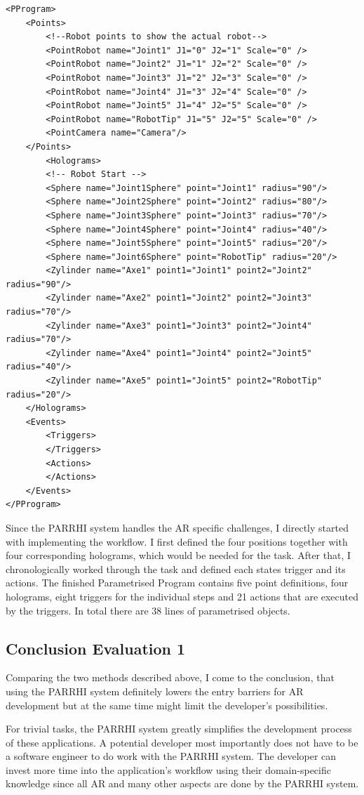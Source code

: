 \begin{lstlisting}
<PProgram>
	<Points>
		<!--Robot points to show the actual robot-->
		<PointRobot name="Joint1" J1="0" J2="1" Scale="0" />
		<PointRobot name="Joint2" J1="1" J2="2" Scale="0" />
		<PointRobot name="Joint3" J1="2" J2="3" Scale="0" />
		<PointRobot name="Joint4" J1="3" J2="4" Scale="0" />
		<PointRobot name="Joint5" J1="4" J2="5" Scale="0" />
		<PointRobot name="RobotTip" J1="5" J2="5" Scale="0" />
		<PointCamera name="Camera"/>
	</Points>
		<Holograms>
		<!-- Robot Start -->
		<Sphere name="Joint1Sphere" point="Joint1" radius="90"/>
		<Sphere name="Joint2Sphere" point="Joint2" radius="80"/>
		<Sphere name="Joint3Sphere" point="Joint3" radius="70"/>
		<Sphere name="Joint4Sphere" point="Joint4" radius="40"/>
		<Sphere name="Joint5Sphere" point="Joint5" radius="20"/>
		<Sphere name="Joint6Sphere" point="RobotTip" radius="20"/>
		<Zylinder name="Axe1" point1="Joint1" point2="Joint2" radius="90"/>
		<Zylinder name="Axe2" point1="Joint2" point2="Joint3" radius="70"/>
		<Zylinder name="Axe3" point1="Joint3" point2="Joint4" radius="70"/>
		<Zylinder name="Axe4" point1="Joint4" point2="Joint5" radius="40"/>
		<Zylinder name="Axe5" point1="Joint5" point2="RobotTip" radius="20"/>
	</Holograms>
	<Events>
		<Triggers>
		</Triggers>
		<Actions>
		</Actions>
	</Events>
</PProgram>
\end{lstlisting}

Since the PARRHI system handles the AR specific challenges, I directly started with implementing the workflow. I first defined the four positions together with four corresponding holograms, which would be needed for the task. After that, I chronologically worked through the task and defined each states trigger and its actions. The finished Parametrised Program contains five point definitions, four holograms, eight triggers for the individual steps and 21 actions that are executed by the triggers. In total there are 38 lines of parametrised objects. 

\subsection{Conclusion Evaluation 1}
Comparing the two methods described above, I come to the conclusion, that using the PARRHI system definitely lowers the entry barriers for AR development but at the same time might limit the developer's possibilities. 

For trivial tasks, the PARRHI system greatly simplifies the development process of these applications. A potential developer most importantly does not have to be a software engineer to do work with the PARRHI system. The developer can invest more time into the application's workflow using their domain-specific knowledge since all AR and many other aspects are done by the PARRHI system.

